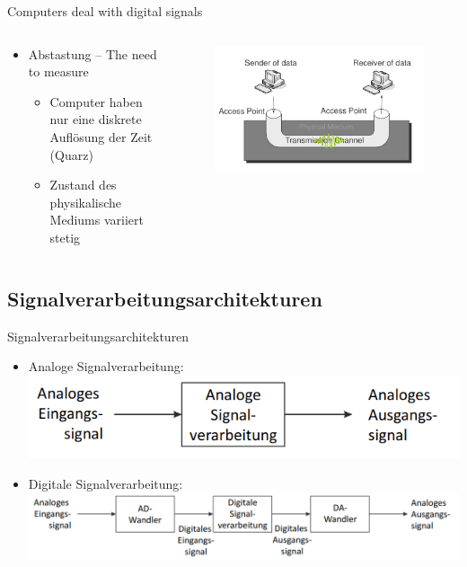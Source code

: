 \documentclass[xcolor=dvipsnames,aspectratio=169]{beamer}
\begin{document}
\begin{frame}{Computers deal with digital signals}
\begin{columns}[T] %
\begin{column}{.48\textwidth}
\begin{itemize}
	\item Abstastung -- The need to measure
	\begin{itemize}
		\item Computer haben nur eine diskrete Auflösung der Zeit (Quarz)
		\item Zustand des physikalische Mediums variiert stetig
	\end{itemize}
\end{itemize}
\end{column}%
\hfill%
\begin{column}{.48\textwidth}
\begin{figure}
\includegraphics[scale=0.3]{rxtx}
\end{figure}
\end{column}%
\end{columns}
\end{frame}

\subsection{Signalverarbeitungsarchitekturen}
\begin{frame}{Signalverarbeitungsarchitekturen}
\begin{itemize}
	\item Analoge Signalverarbeitung:\\
	\includegraphics[scale=0.35]{analog}
	\item Digitale Signalverarbeitung:\\
	\includegraphics[scale=0.35]{ds}
\end{itemize}
\end{frame}
\end{document}
